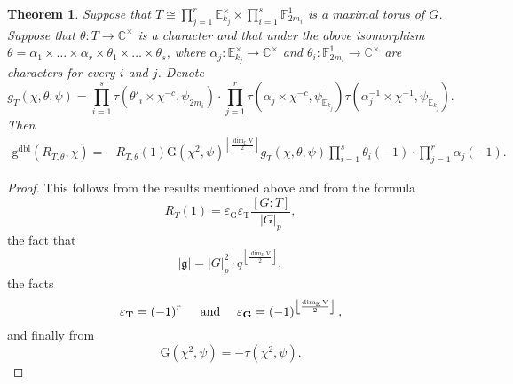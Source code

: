 \documentclass[12pt, reqno]{amsart}
\newtheorem{theorem}{Theorem}[section]
\theoremstyle{definition}
\theoremstyle{definition}
\theoremstyle{definition}
\newcommand{\cComplex}{\mathbb{C}}
\newcommand{\multiplicativegroup}[1]{#1^{\times}}
\newcommand{\sizeof}[1]{\left|#1\right|}
\newcommand{\hermitianSpace}{\mathrm{V}}
\newcommand{\fieldCharacter}{\psi}
\newcommand{\grpIndex}[2]{\left[#1:#2\right]}
\newcommand{\minusInvolution}[1]{#1^{-c}}
\newcommand{\finiteField}{\mathbb{F}}
\newcommand{\quadraticExtension}{\mathbb{E}}
\newcommand{\finiteFieldExtension}[1]{\finiteField_{#1}}
\newcommand{\quadraticFieldExtension}[1]{\quadraticExtension_{#1}}
\newcommand{\GaussSumScalar}[2]{\mathrm{G}\left(#1, #2\right)}
\newcommand{\dblVirtualGaussSumScalar}[2]{\mathrm{g}^{\mathrm{dbl}}\left(#1, #2\right)}
\newcommand{\GaussSumCharacter}[3]{\tau\left(#1 \times #2, #3\right)}
\newcommand{\lieAlgebra}{\mathfrak{g}}
\newcommand{\algebraicGroup}[1]{\boldsymbol{\mathrm{#1}}}
\begin{document}
\begin{theorem}\label{thm:computation-of-doubling-gauss-sum-scalar-for-deligne-lusztig-characters}
	Suppose that $T \cong \prod_{j=1}^r \multiplicativegroup{\quadraticFieldExtension{k_j}} \times \prod_{i=1}^s \finiteFieldExtension{2m_i}^1$ is a maximal torus of $G$. Suppose that $\theta \colon T \to \multiplicativegroup{\cComplex}$ is a character and that under the above isomorphism $\theta = \alpha_1 \times \dots \times \alpha_r \times \theta_1 \times \dots \times \theta_s$, where $\alpha_j \colon \multiplicativegroup{\quadraticFieldExtension{k_j}} \to \multiplicativegroup{\cComplex}$ and $\theta_i \colon \finiteFieldExtension{2m_i}^1 \to \multiplicativegroup{\cComplex}$ are characters for every $i$ and $j$. Denote $$g_T\left(\chi, \theta, \fieldCharacter\right) = \prod_{i=1}^s \GaussSumCharacter{\theta'_i}{\minusInvolution{\chi}}{\fieldCharacter_{2m_i}} \cdot  \prod_{j=1}^r \GaussSumCharacter{\alpha_j}{\minusInvolution{\chi}}{\fieldCharacter_{\quadraticFieldExtension{k_j}}} \GaussSumCharacter{\alpha_j^{-1}}{\chi^{-1}}{\fieldCharacter_{\quadraticFieldExtension{k_j}}}.$$ Then
	\begin{align*}
		 \dblVirtualGaussSumScalar{R_{T, \theta}}{\chi} =& R_{T,\theta}\left(1\right) \GaussSumScalar{\chi^2}{\fieldCharacter}^{\left\lfloor\frac{\dim_{\quadraticExtension} \hermitianSpace}{2}\right\rfloor} g_T\left(\chi, \theta, \fieldCharacter\right) \prod_{i=1}^s \theta_i\left(-1\right) \cdot \prod_{j=1}^r \alpha_j\left(-1\right).
	\end{align*}
\end{theorem}
\begin{proof}
	This follows from the results mentioned above and from the formula $$R_T\left(1\right) = \varepsilon_{\algebraicGroup{G}} \varepsilon_{\algebraicGroup{T}} \frac{\grpIndex{G}{T}}{\sizeof{G}_p},$$ the fact that $$ \sizeof{\lieAlgebra} = \sizeof{G}_p^2 \cdot q^{\left\lfloor\frac{\dim_{\quadraticExtension} \hermitianSpace}{2}\right\rfloor},$$
	the facts \begin{equation*}
		\varepsilon_{\algebraicGroup{T}} = \left(-1\right)^r \text{\,\,\,\,\,\, and \,\,\,\,\,\,}  \varepsilon_{\algebraicGroup{G}} = \left(-1\right)^{\left\lfloor\frac{\dim_{\quadraticExtension} \hermitianSpace}{2}\right\rfloor},
	\end{equation*}
	and finally from $$\GaussSumScalar{\chi^2}{\fieldCharacter} = -\tau\left(\chi^2, \fieldCharacter\right).$$
\end{proof}
\end{document}
